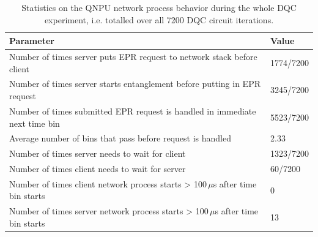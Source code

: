 \begin{table}
    \centering
    \begin{tabular}{|l|l|}
    \hline
    \textbf{Parameter} & \textbf{Value} \\ 
    \hline
    Number of times server puts \ac{EPR} request to network stack before client & 1774/7200 \\
    Number of times server starts entanglement before putting in \ac{EPR} request & 3245/7200 \\
    Number of times submitted \ac{EPR} request is handled in immediate next time bin & 5523/7200 \\
    Average number of bins that pass before request is handled & 2.33 \\
    Number of times server needs to wait for client & 1323/7200 \\
    Number of times client needs to wait for server & 60/7200 \\
    Number of times client network process starts > 100\,$\mu$s after time bin starts & 0 \\
    Number of times server network process starts > 100\,$\mu$s after time bin starts & 13 \\
    \hline
    \end{tabular}
    \caption{Statistics on the \ac{QNPU} network process behavior during the whole \ac{DQC} experiment, i.e. totalled over all 7200 \ac{DQC} circuit iterations.}
    \label{tab:network_process_stats}
\end{table}